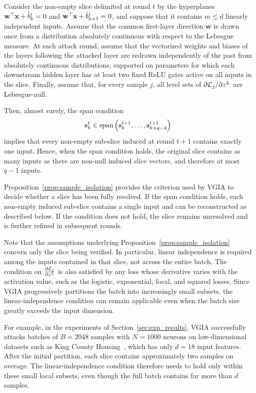 \begin{proposition}
\label{prop:sample_isolation}
Consider the non-empty slice delimited at round $t$ by the hyperplanes
$\mathbf w^\top {\mathbf{x}}+\hat b_k^t=0$ and $\mathbf w^\top {\mathbf{x}}+\hat b_{k+1}^t=0$,
and suppose that it contains $m\le d$ linearly independent inputs. Assume that
the common first-layer direction $\mathbf w$ is drawn once from a distribution
absolutely continuous with respect to the Lebesgue measure. At each attack round,
assume that the vectorized weights and biases of the layers following the
attacked layer are redrawn independently of the past from absolutely continuous
distributions, supported on parameters for which each downstream hidden layer
has at least two fixed ReLU gates active on all inputs in the slice. Finally,
assume that, for every sample $j$, all level sets of
$\partial \mathcal{L}_j/\partial z^L$ are Lebesgue-null.

Then, almost surely, the span condition
\[
\mathbf{s}_k^t
\in
\operatorname{span}\left(
\mathbf{s}_k^{t+1},\ldots,\mathbf{s}_{k+q-2}^{t+1}
\right)
\]
implies that every non-empty sub-slice induced at round $t+1$ contains exactly
one input. Hence, when the span condition holds, the original slice contains
as many inputs as there are non-null induced slice vectors, and therefore at
most $q-1$ inputs.
\end{proposition}

Proposition~\ref{prop:sample_isolation} provides the criterion used by VGIA to decide whether a slice has been fully resolved. If the span condition holds, each non-empty induced sub-slice contains a single input and can be reconstructed as described below. If the condition does not hold, the slice remains unresolved and is further refined in subsequent rounds.

Note that the assumptions underlying Proposition~\ref{prop:sample_isolation} concern only the slice being verified. In particular, linear independence is required among the inputs contained in that slice, not across the entire batch. The condition on $\frac{\partial \mathcal{L}_j}{\partial z^L}$ is also satisfied by any loss whose derivative varies with the activation value, such as the logistic, exponential, focal, and squared losses. Since VGIA progressively partitions the batch into increasingly small subsets, the linear-independence condition can remain applicable even when the batch size greatly exceeds the input dimension.

For example, in the experiments of Section~\ref{sec:exp_results}, VGIA successfully attacks batches of $B=2048$ samples with $N=1000$ neurons on low-dimensional datasets such as King County Housing~\cite{kingcountyhousing}, which has only $d=18$ input features. After the initial partition, each slice contains approximately two samples on average. The linear-independence condition therefore needs to hold only within these small local subsets, even though the full batch contains far more than $d$ samples.

